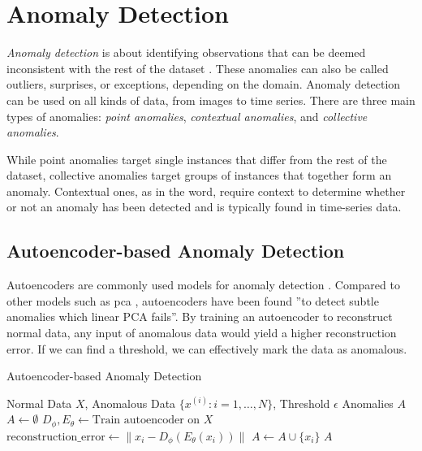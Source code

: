 \section{Anomaly Detection}
\label{back:anomdet}

\textit{Anomaly detection} is about identifying observations that can be deemed inconsistent with the rest of the dataset \cite{anomaly}. These anomalies can also be called outliers, surprises, or exceptions, depending on the domain. Anomaly detection can be used on all kinds of data, from images to time series. There are three main types of anomalies: \textit{point anomalies}, \textit{contextual anomalies}, and \textit{collective anomalies}.

While point anomalies target single instances that differ from the rest of the dataset, collective anomalies target groups of instances that together form an anomaly. Contextual ones, as in the word, require context to determine whether or not an anomaly has been detected and is typically found in time-series data.



\subsection{Autoencoder-based Anomaly Detection}

Autoencoders are commonly used models for anomaly detection \cite{an2015variational, zhou2017anomaly}. Compared to other models such as \acrfull{pca} \cite{wold1987principal}, autoencoders have been found ''to detect subtle anomalies which linear PCA fails''\cite{sakurada2014anomaly}. By training an autoencoder to reconstruct normal data, any input of anomalous data would yield a higher reconstruction error. If we can find a threshold, we can effectively mark the data as anomalous. 

\begin{algorithm}[!h]
\caption{Autoencoder-based Anomaly Detection}
\label{alg:ad}
\begin{algorithmic}[1]
\small
\Require Normal Data $X$, Anomalous Data $\{x^{(i)} : i = 1, \ldots, N\}$, Threshold $\epsilon$
\Ensure Anomalies $A$
\State $A \gets \emptyset$
\State $D_\phi, E_\theta \gets \text{Train autoencoder on } X$
    \State $\text{reconstruction\_error} \gets \|x_i - D_\phi(E_\theta(x_i))\|$
        \State $A \gets A \cup \{x_i\}$
    \EndIf
\EndFor
\State \Return $A$
\end{algorithmic}
\end{algorithm}

